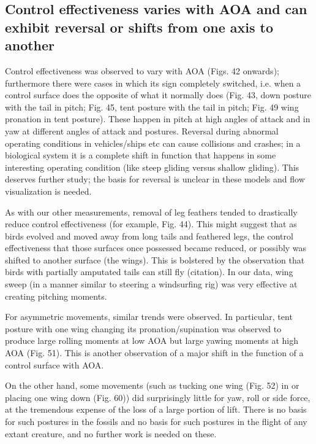 \subsection{Control effectiveness varies with AOA and can exhibit reversal or shifts from one axis to another}
Control effectiveness was observed to vary with AOA (Figs. 42 onwards); furthermore there were cases in which its sign completely switched, i.e. when a control surface does the opposite of what it normally does (Fig. 43, down posture with the tail in pitch; Fig. 45, tent posture with the tail in pitch; Fig. 49 wing pronation in tent posture).  These happen in pitch at high angles of attack and in yaw at different angles of attack and postures.  Reversal during abnormal operating conditions in vehicles/ships etc can cause collisions and crashes; in a biological system it is a complete shift in function that happens in some interesting operating condition (like steep gliding versus shallow gliding). This deserves further study; the basis for reversal is unclear in these models and flow visualization is needed.   

As with our other measurements, removal of leg feathers tended to drastically reduce control effectiveness (for example, Fig. 44).  This might suggest that as birds evolved and moved away from long tails and feathered legs, the control effectiveness that those surfaces once possessed became reduced, or possibly was shifted to another surface (the wings).  This is bolstered by the observation that birds with partially amputated tails can still fly (citation).  In our data, wing sweep (in a manner similar to steering a windsurfing rig) was very effective at creating pitching moments.  

For asymmetric movements, similar trends were observed.  In particular, tent posture with one wing changing its pronation/supination was observed to produce large rolling moments at low AOA but large yawing moments at high AOA (Fig. 51).  This is another observation of a major shift in the function of a control surface with AOA.  

On the other hand, some movements (such as tucking one wing (Fig. 52) in or placing one wing down (Fig. 60)) did surprisingly little for yaw, roll or side force, at the tremendous expense of the loss of a large portion of lift.  There is no basis for such postures in the fossils and no basis for such postures in the flight of any extant creature, and no further work is needed on these. 










